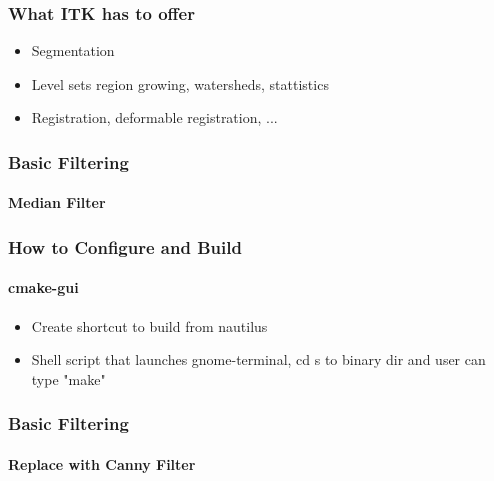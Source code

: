\begin{frame}
\frametitle{What ITK has to offer}
\begin{itemize}
\item Segmentation
\pause
\item Level sets region growing, watersheds, stattistics
\pause
\item Registration, deformable registration, ...
\end{itemize}
\end{frame}


\begin{frame}
\frametitle{Basic Filtering}
\framesubtitle{Median Filter}
\begin{center}

\end{center}
\end{frame}


\begin{frame}
\frametitle{How to Configure and Build}
\framesubtitle{cmake-gui}
\begin{itemize}
\item Create shortcut to build from nautilus
\item Shell script that launches gnome-terminal, cd s to binary dir and user can type "make"
\end{itemize}
\end{frame}


\begin{frame}
\frametitle{Basic Filtering}
\framesubtitle{Replace with Canny Filter}
\begin{center}

\end{center}
\end{frame}
